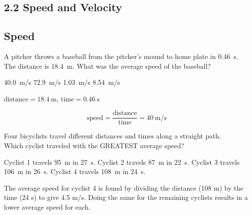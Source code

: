 \documentclass[addpoints]{exam}
\begin{document}
\begin{questions}


\clearpage
\section*{2.2 Speed and Velocity}
\subsection*{Speed}

\question
A pitcher throws a baseball from the pitcher's mound to home plate in \SI{0.46}{s}. The distance is \SI{18.4}{m}. What was the average speed of the baseball?

\begin{choices}
\correctchoice \SI{40.0}{m/s}
\choice \SI{72.9}{m/s}
\choice \SI{1.03}{m/s}
\choice \SI{8.54}{m/s}
\end{choices}

\begin{solution}
    $\text{distance} = \SI{18.4}{\meter}$, $\text{time}=\SI{0.46}{\second}$

\begin{equation*}
    \text{speed} = \frac{\text{distance}}{\text{time}} = \SI{40}{\meter/\second}
\end{equation*}
\end{solution}

\question
Four bicyclists travel different distances and times along a straight path. \\
Which cyclist traveled with the GREATEST average speed?

\begin{choices}
\choice Cyclist 1 travels \SI{95}{m} in \SI{27}{s}.
\choice Cyclist 2 travels \SI{87}{m} in \SI{22}{s}.
\choice Cyclist 3 travels \SI{106}{m} in \SI{26}{s}.
\CorrectChoice Cyclist 4 travels \SI{108}{m} in \SI{24}{s}.
\end{choices}

\begin{solution}
The average speed for cyclist 4 is found by dividing the distance (108 m) by the time (24 s) to give 4.5 m/s. Doing the same for the remaining cyclists results in a lower average speed for each.
\end{solution}



\end{questions}
\end{document}
